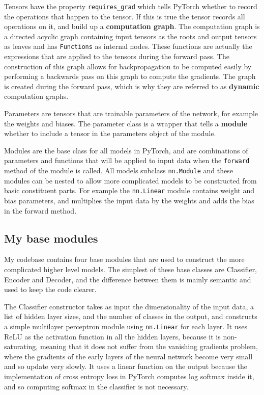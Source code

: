 \documentclass[12pt,a4paper,twoside,openright]{report}
\begin{document}
Tensors have the property \texttt{requires\_grad} which tells PyTorch whether to record the operations that happen to the tensor. If 
this is true the tensor records all operations on it, and build up a \textbf{computation graph}. The computation graph is a 
directed acyclic graph containing input tensors as the roots and output
tensors as leaves and has \texttt{Functions} as internal nodes. These functions are actually the expressions that are applied to the 
tensors during the forward pass. The construction of this graph allows for backpropagation to be computed easily by performing a 
backwards pass on this graph to compute the gradients. The graph is created during the forward pass, which is why they are referred to 
as \textbf{dynamic} computation graphs.

Parameters are tensors that are trainable parameters of the network, for example the weights and biases. The parameter class is a 
wrapper that tells a \textbf{module} whether to include a tensor in the parameters object of the module.

Modules are the base class for all models in PyTorch, and are combinations of parameters and functions that will be applied to input 
data when the \texttt{forward} method of the module is called. All models subclass \texttt{nn.Module} and these modules can be nested
to allow more complicated models to be constructed from basic constituent parts. For example the \texttt{nn.Linear} module contains 
weight and bias parameters, and multiplies the input data by the weights and adds the bias in the forward method.

\subsection{My base modules}
My codebase contains four base modules that are used to construct the more complicated higher level models. The simplest of 
these base classes are Classifier, Encoder and Decoder, and the difference between them is mainly semantic and used to keep the
code clearer.

The Classifier constructor takes as input the dimensionality of the input data, a list of hidden layer sizes, and the number of classes 
in the output, and constructs a simple multilayer perceptron module using \texttt{nn.Linear} for each layer. It uses ReLU as the activation 
function in all the hidden layers,
because it is non-saturating, meaning that it does not suffer from the vanishing gradients problem, where the gradients of the early layers
of the neural network become very small and so update very slowly. It uses a linear function on the output because the implementation of 
cross entropy loss in PyTorch computes log softmax inside it, and so computing softmax in the classifier is not necessary.
\end{document}
